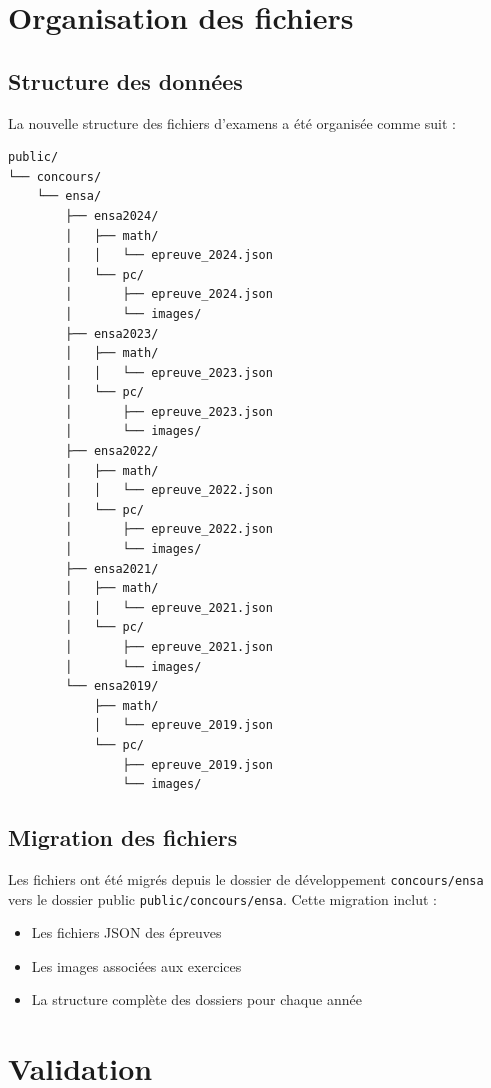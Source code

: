 \documentclass[12pt,a4paper]{article}
\begin{document}
\section{Organisation des fichiers}

\subsection{Structure des données}

La nouvelle structure des fichiers d'examens a été organisée comme suit :

\begin{lstlisting}[caption=Nouvelle structure des dossiers]
public/
└── concours/
    └── ensa/
        ├── ensa2024/
        │   ├── math/
        │   │   └── epreuve_2024.json
        │   └── pc/
        │       ├── epreuve_2024.json
        │       └── images/
        ├── ensa2023/
        │   ├── math/
        │   │   └── epreuve_2023.json
        │   └── pc/
        │       ├── epreuve_2023.json
        │       └── images/
        ├── ensa2022/
        │   ├── math/
        │   │   └── epreuve_2022.json
        │   └── pc/
        │       ├── epreuve_2022.json
        │       └── images/
        ├── ensa2021/
        │   ├── math/
        │   │   └── epreuve_2021.json
        │   └── pc/
        │       ├── epreuve_2021.json
        │       └── images/
        └── ensa2019/
            ├── math/
            │   └── epreuve_2019.json
            └── pc/
                ├── epreuve_2019.json
                └── images/
\end{lstlisting}

\subsection{Migration des fichiers}

Les fichiers ont été migrés depuis le dossier de développement \texttt{concours/ensa} vers le dossier public \texttt{public/concours/ensa}. Cette migration inclut :
\begin{itemize}
    \item Les fichiers JSON des épreuves
    \item Les images associées aux exercices
    \item La structure complète des dossiers pour chaque année
\end{itemize}

\section{Validation}
\end{document}
